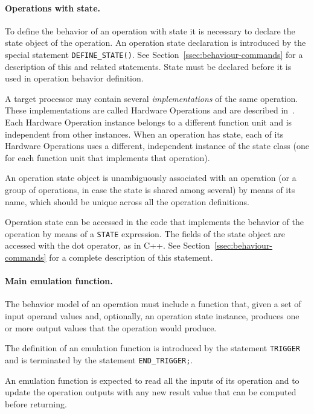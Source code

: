 \documentclass[twoside]{tceusermanual}
\begin{document}
\paragraph{Operations with state.}

To define the behavior of an operation with state it is necessary to
declare the state object of the operation.  An operation state declaration
is introduced by the special statement \verb#DEFINE_STATE()#.  See
Section~\ref{ssec:behaviour-commands} for a description of this and related
statements. State must be declared before it is used in operation behavior
definition. 

A target processor may contain several \emph{implementations} of the
same operation.  These implementations are called Hardware Operations and
are described in~\cite{ADF-specs}.
%
Each Hardware Operation instance belongs to a different function unit and is
independent from other instances.
%
When an operation has state, each of its Hardware Operations uses a
different, independent instance of the state class (one for each function
unit that implements that operation).

An operation state object is unambiguously associated with an operation (or
a
group of operations, in case the state is shared among several) by means of
its name, which should be unique across all the operation definitions.%

Operation state can be accessed in the code that implements the behavior of
the operation by means of a \verb#STATE# expression.  The fields of the
state object are accessed with the dot operator, as in C++.  See
Section~\ref{ssec:behaviour-commands} for a complete description of this
statement.

\paragraph{Main emulation function.}
The behavior model of an operation must include a function that, given a
set of input operand values and, optionally, an operation state instance,
produces one or more output values that the operation would produce.

The definition of an emulation function is introduced by the statement
\verb#TRIGGER# and is terminated by the statement \verb#END_TRIGGER;#.  

An emulation function is expected to read all the inputs of its operation
and to update the operation outputs with any new result value that can be
computed before returning.
\end{document}
